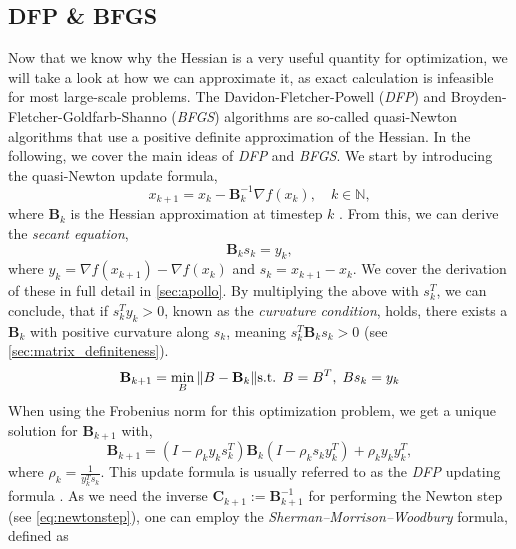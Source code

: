 \subsection{DFP \& BFGS \cite{nocedal2006numerical}}
\label{sec:bfgs}
Now that we know why the Hessian is a very useful quantity for optimization, we will take a look at how we can approximate it,
as exact calculation is infeasible for most large-scale problems.
The Davidon-Fletcher-Powell (\emph{DFP}\cite{Goodfellow-et-al-2016})  and Broyden-Fletcher-Goldfarb-Shanno (\emph{BFGS}\cite{BFGS})
algorithms are so-called quasi-Newton algorithms 
that use a positive definite approximation of the Hessian. In the following,
we cover the main ideas of \emph{DFP} and \emph{BFGS}. We start by introducing the quasi-Newton update formula,
\begin{equation}
x_{k+1} = x_k - \mathbf{B}_k^{-1} \nabla f(x_k), \quad k \in \mathbb{N},
\end{equation}
where $\mathbf{B}_k$ is the Hessian approximation at timestep $k$ \cite{nocedal2006numerical}.
From this, we can derive the \emph{secant equation},
\begin{equation}
\mathbf{B}_k s_k = y_k,
\end{equation}
where $y_k = \nabla f(x_{k+1}) - \nabla f(x_k)$ and $s_k = x_{k+1} - x_k$.
We cover the derivation of these in full detail in \ref{sec:apollo}.
By multiplying the above with $s_k^T$, we can conclude, that if $s_k^T y_k > 0$,
known as the \emph{curvature condition}, holds, there exists a $\mathbf{B}_k$ with positive curvature along $s_k$,
meaning $s_k^T\mathbf{B}_k s_k > 0$ (see \ref{sec:matrix_definiteness}).
\begin{equation}
    \mathbf{B}_{k+1} = \min_{B} \|B - \mathbf{B}_k\| \\
    \text{s.t. }   B = B^T, \; Bs_k = y_k 
   \end{equation}
When using the Frobenius norm for this optimization problem, we get a unique solution for $\mathbf{B}_{k+1}$ with,
\begin{equation} \label{eq:DFP}
\mathbf{B}_{k+1} = \left(I - \rho_k y_k s_k^T\right) \mathbf{B}_k \left(I - \rho_k s_k y_k^T\right) + \rho_k y_k y_k^T,
\end{equation}
where $\rho_k = \frac{1}{y_k^T s_k}$. This update formula is usually referred to as the \emph{DFP} updating formula \cite{DFP}.
As we need the inverse $\mathbf{C}_{k+1} := \mathbf{B}_{k+1}^{-1}$ for performing the Newton step (see \ref{eq:newtonstep}), one can employ the \emph{Sherman--Morrison--Woodbury} formula, defined as
